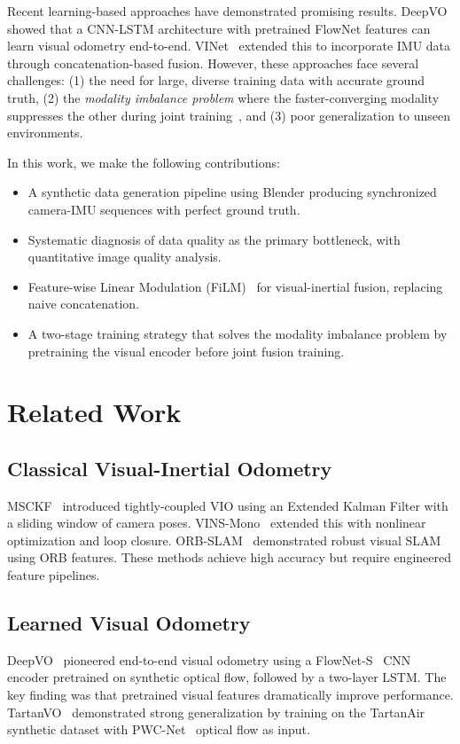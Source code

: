 \documentclass[conference]{IEEEtran}
\begin{document}
Recent learning-based approaches have demonstrated promising results. DeepVO~\cite{wang2017} showed that a CNN-LSTM architecture with pretrained FlowNet features can learn visual odometry end-to-end. VINet~\cite{clark2017} extended this to incorporate IMU data through concatenation-based fusion. However, these approaches face several challenges: (1) the need for large, diverse training data with accurate ground truth, (2) the \textit{modality imbalance problem} where the faster-converging modality suppresses the other during joint training~\cite{wang2020multimodal}, and (3) poor generalization to unseen environments.

In this work, we make the following contributions:
\begin{itemize}
    \item A synthetic data generation pipeline using Blender producing synchronized camera-IMU sequences with perfect ground truth.
    \item Systematic diagnosis of data quality as the primary bottleneck, with quantitative image quality analysis.
    \item Feature-wise Linear Modulation (FiLM)~\cite{perez2018} for visual-inertial fusion, replacing naive concatenation.
    \item A two-stage training strategy that solves the modality imbalance problem by pretraining the visual encoder before joint fusion training.
\end{itemize}

\section{Related Work}

\subsection{Classical Visual-Inertial Odometry}
MSCKF~\cite{mourikis2007} introduced tightly-coupled VIO using an Extended Kalman Filter with a sliding window of camera poses. VINS-Mono~\cite{qin2018} extended this with nonlinear optimization and loop closure. ORB-SLAM~\cite{mur2015} demonstrated robust visual SLAM using ORB features. These methods achieve high accuracy but require engineered feature pipelines.

\subsection{Learned Visual Odometry}
DeepVO~\cite{wang2017} pioneered end-to-end visual odometry using a FlowNet-S~\cite{dosovitskiy2015} CNN encoder pretrained on synthetic optical flow, followed by a two-layer LSTM. The key finding was that pretrained visual features dramatically improve performance. TartanVO~\cite{wang2021} demonstrated strong generalization by training on the TartanAir~\cite{wang2020tartanair} synthetic dataset with PWC-Net~\cite{sun2018} optical flow as input.
\end{document}
